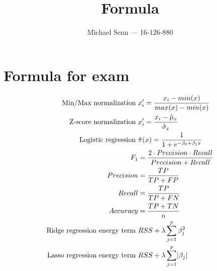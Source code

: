 \documentclass[a4paper]{scrreprt}
\title{Formula}
\author{Michael Senn \maillink{michael.senn@students.unibe.ch} --- 16-126-880}
\date{\printdate}
\DeclarePairedDelimiter\abs{\lvert}{\rvert}
\begin{document}
\maketitle

\chapter{Formula for exam}

\begin{align*}
		\text{Min/Max normalization } & x_i' = \frac{x_i - min(x)}{max(x) - min(x)} \\
		\text{Z-score normalization } & x_i' = \frac{x_i - \hat{\mu}_x}{\hat{\sigma}_x} \\
		\text{Logistic regression } & \hat{\pi}(x) = \frac{1}{1 + e^{-\beta_0 + \beta_1 x}} \\
		F_1 & = \frac{2 \cdot Precision \cdot Recall}{Precision + Recall} \\
		Precision & = \frac{TP}{TP + FP} \\
		Recall & = \frac{TP}{TP + FN} \\
		Accuracy & = \frac{TP + TN}{n} \\
		\text{Ridge regression energy term } & RSS + \lambda \sum_{j=1}^{p} \beta_j^2 \\
		\text{Lasso regression energy term } & RSS + \lambda \sum_{j=1}^{p} \abs{\beta_j} 
\end{align*}
\end{document}
